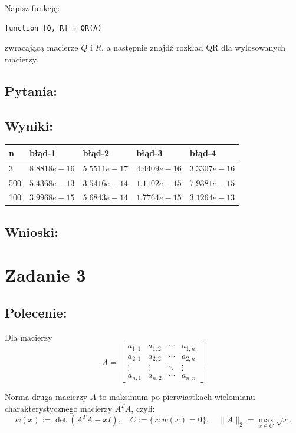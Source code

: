 \documentclass[a4paper, 11pt]{article}
\begin{document}
Napisz funkcję:
\begin{center}
\begin{verbatim}
function [Q, R] = QR(A)
\end{verbatim}
\end{center}
zwracającą macierze \( Q \) i \( R \), a następnie znajdź rozkład QR dla wylosowanych macierzy.

\subsection{Pytania:} 

\subsection{Wyniki:} 
\begin{center}
\begin{tabular}{|l|l|l|l|l|}
\hline
n   & błąd-1       & błąd-2       & błąd-3       & błąd-4       \\ \hline
3   & $8.8818e-16$ & $5.5511e-17$ & $4.4409e-16$ & $3.3307e-16$ \\ \hline
500 & $5.4368e-13$ & $3.5416e-14$ & $1.1102e-15$ & $7.9381e-15$ \\ \hline
100 & $3.9968e-15$ & $5.6843e-14$ & $1.7764e-15$ & $3.1264e-13$ \\ \hline
\end{tabular}
\end{center}
\subsection{Wnioski:}

\section{Zadanie 3}
\subsection{Polecenie:}
Dla macierzy
\[
A = \begin{bmatrix}
a_{1,1} & a_{1,2} & \cdots & a_{1,n} \\
a_{2,1} & a_{2,2} & \cdots & a_{2,n} \\
\vdots & \vdots & \ddots & \vdots \\
a_{n,1} & a_{n,2} & \cdots & a_{n,n}
\end{bmatrix}
\]

Norma druga macierzy \( A \) to maksimum po pierwiastkach wielomianu charakterystycznego macierzy \( A^T A \), czyli:
\[
w(x) := \det(A^T A - x I), \quad C := \{ x : w(x) = 0 \}, \quad \|A\|_2 = \max_{x \in C} \sqrt{x}.
\]
\end{document}
